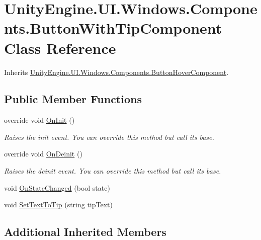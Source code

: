 \hypertarget{class_unity_engine_1_1_u_i_1_1_windows_1_1_components_1_1_button_with_tip_component}{}\section{Unity\+Engine.\+U\+I.\+Windows.\+Components.\+Button\+With\+Tip\+Component Class Reference}
\label{class_unity_engine_1_1_u_i_1_1_windows_1_1_components_1_1_button_with_tip_component}


Inherits \hyperlink{class_unity_engine_1_1_u_i_1_1_windows_1_1_components_1_1_button_hover_component}{Unity\+Engine.\+U\+I.\+Windows.\+Components.\+Button\+Hover\+Component}.

\subsection*{Public Member Functions}
\begin{DoxyCompactItemize}
\item 
override void \hyperlink{class_unity_engine_1_1_u_i_1_1_windows_1_1_components_1_1_button_with_tip_component_a093c510ecbdfbb5440a976320fde9ebf}{On\+Init} ()
\begin{DoxyCompactList}\small\item\em Raises the init event. You can override this method but call it\textquotesingle{}s base. \end{DoxyCompactList}\item 
override void \hyperlink{class_unity_engine_1_1_u_i_1_1_windows_1_1_components_1_1_button_with_tip_component_ab641deb8b76f185620ccd16aba85a205}{On\+Deinit} ()
\begin{DoxyCompactList}\small\item\em Raises the deinit event. You can override this method but call it\textquotesingle{}s base. \end{DoxyCompactList}\item 
void \hyperlink{class_unity_engine_1_1_u_i_1_1_windows_1_1_components_1_1_button_with_tip_component_afba6469bb0afdc0141e37fcc48bdfdde}{On\+State\+Changed} (bool state)
\item 
void \hyperlink{class_unity_engine_1_1_u_i_1_1_windows_1_1_components_1_1_button_with_tip_component_a6342522f508a18d99425f52f72771f6e}{Set\+Text\+To\+Tip} (string tip\+Text)
\end{DoxyCompactItemize}
\subsection*{Additional Inherited Members}



